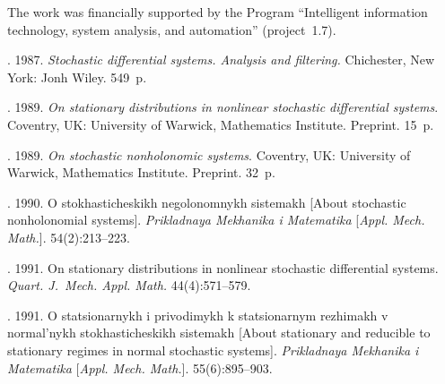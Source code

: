 
\vspace*{-24pt}

\Ack
\noindent
The work was financially supported by the Program ``Intelligent information
technology, system analysis, and automation'' (project~1.7).

\vspace*{-2pt}


  \begin{multicols}{2}

\renewcommand{\bibname}{\protect\rmfamily References}

{\small\frenchspacing
{%
\begin{thebibliography}{99}

\vspace*{-5pt}

.  1987.
\textit{Stochastic differential systems. Analysis and filtering.}
Chichester, New York: Jonh Wiley. 549~p.


. 1989.
\textit{On stationary distributions in nonlinear stochastic differential systems}.
Coventry, UK: University of Warwick, Mathematics Institute. Preprint.
15~p.

.  1989.
\textit{On stochastic nonholonomic systems}.
Coventry, UK: University of Warwick, Mathematics Institute. Preprint. 32~p.

. 1990.
 O stokhasti\-che\-skikh negolonomnykh sistemakh
 [About stochastic nonholonomial systems].
 \textit{Prikladnaya Mekhanika i Matematika}
 [\textit{Appl. Mech. Math.}]. 54(2):213--223.

. 1991.
On stationary distributions in nonlinear stochastic differential systems.
\textit{Quart. J.~Mech. Appl. Math.} 44(4):571--579.

. 1991.
 O statsi\-o\-nar\-nykh i privodimykh k statsionarnym rezhimakh v
 normal'nykh stokhasticheskikh sistemakh
 [About stationary and reducible to stationary regimes in normal
 stochastic systems].
 \textit{Prikladnaya Mekhanika i Matematika}
 [\textit{Appl. Mech. Math.}]. 55(6):895--903.


\end{thebibliography}}}
\end{multicols}
